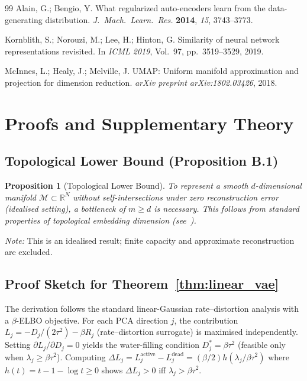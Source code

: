 \documentclass[11pt,a4paper]{article}
\newtheorem{proposition}{Proposition}
\newcommand{\R}{\mathbb{R}}
\begin{document}
\begin{thebibliography}{99}
Alain, G.; Bengio, Y.
What regularized auto-encoders learn from the data-generating distribution.
\textit{J.~Mach.~Learn.~Res.} \textbf{2014}, \textit{15}, 3743--3773.

Kornblith, S.; Norouzi, M.; Lee, H.; Hinton, G.
Similarity of neural network representations revisited.
In \textit{ICML 2019}, Vol.~97, pp.~3519--3529, 2019.

McInnes, L.; Healy, J.; Melville, J.
UMAP: Uniform manifold approximation and projection for dimension reduction.
\textit{arXiv preprint arXiv:1802.03426}, 2018.

\end{thebibliography}

\appendix

\section{Proofs and Supplementary Theory}\label{app:proofs}

\subsection{Topological Lower Bound (Proposition B.1)}\label{app:lower_bound}

\begin{proposition}[Topological Lower Bound]
To represent a smooth $d$-dimensional manifold $\mathcal{M}\subset\R^N$
without self-intersections under zero reconstruction error (idealised setting),
a bottleneck of $m\geq d$ is necessary.
This follows from standard properties of topological embedding dimension
(see~\cite{hatcher2002algebraic}).
\end{proposition}

\noindent
\textit{Note:} This is an idealised result; finite capacity and approximate
reconstruction are excluded.

\subsection{Proof Sketch for Theorem~\ref{thm:linear_vae}}\label{app:linear_vae_proof}

The derivation follows the standard linear-Gaussian rate--distortion analysis
with a $\beta$-ELBO objective.  For each PCA direction $j$, the contribution
$L_j = -D_j/(2\tau^2) - \beta R_j$ (rate--distortion surrogate) is maximised
independently.
Setting $\partial L_j/\partial D_j=0$ yields the water-filling condition
$D_j^*=\beta\tau^2$ (feasible only when $\lambda_j\geq\beta\tau^2$).
Computing $\Delta L_j = L_j^{\mathrm{active}}-L_j^{\mathrm{dead}}
= (\beta/2)h(\lambda_j/\beta\tau^2)$ where $h(t)=t-1-\log t\geq0$
shows $\Delta L_j>0$ iff $\lambda_j>\beta\tau^2$.
\end{document}
